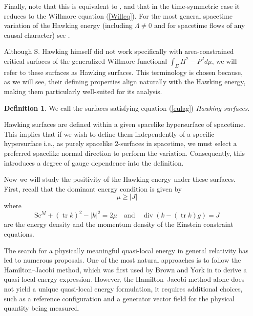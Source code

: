 \documentclass[12pt,a4paper]{amsart}
\theoremstyle{plain}
\theoremstyle{definition}
\newtheorem{definition}[theorem]{Definition}
\newcommand{\diver}{\operatorname{div}}
\newcommand{\tr}{\operatorname{tr}}
\begin{document}
Finally, note that this is equivalent to \cite[Lemma 2.8]{Alex}, and  that in the time‐symmetric case  it reduces to the Willmore equation (\ref{Willeq}). For the most general spacetime variation of the Hawking energy (including $\Lambda\neq0$ and for spacetime flows of any causal character) see \cite{bray2007generalized}.



Although S. Hawking himself did not work specifically with area-constrained critical surfaces of the generalized Willmore functional $ \int_\Sigma H^2 -P^2 d\mu$, we will refer to these surfaces as Hawking surfaces. This terminology is chosen because, as we will see, their defining properties align naturally with the Hawking energy, making them particularly well-suited for its analysis.
\begin{definition}
 We call the surfaces satisfying  equation   (\ref{eulag}) \emph{Hawking surfaces}.  
\end{definition}
    Hawking surfaces are defined within a given spacelike hypersurface of spacetime. This implies that if we wish to define them independently of a specific hypersurface i.e., as purely spacelike $2$-surfaces in spacetime, we must select a preferred spacelike normal direction to perform the variation. Consequently, this introduces a degree of gauge dependence into the definition.

 


Now we will study the positivity of the Hawking energy under these surfaces. First, recall that the dominant energy condition is given by 
\begin{equation}
    \mu \geq |J|
\end{equation}
where 
\begin{equation}
     \mathrm{Sc}^M + (\tr k)^2 - |k|^2=2 \mu \quad \text{and} \quad  \diver (k -(\tr k) g)= J
\end{equation}
are the energy density and the momentum density of the Einstein constraint equations.


The search for a physically meaningful quasi-local energy in general relativity has led to numerous proposals. One of the most natural approaches is to follow the Hamilton–Jacobi method, which was first used by Brown and York in \cite{brown1993quasilocal} to derive a quasi-local energy expression. However, the Hamilton–Jacobi method alone does not yield a unique quasi-local energy formulation, it requires additional choices, such as a reference configuration and a generator vector field for the physical quantity being measured.
\end{document}

